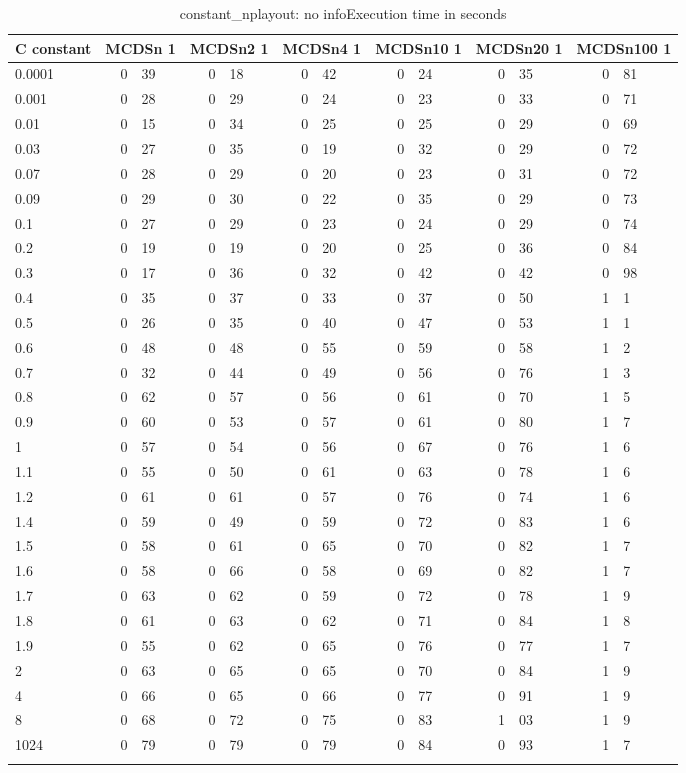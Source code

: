 \begin{table}
    \caption{constant_nplayout: no infoExecution time in seconds}
    \begin{tabular}{l*6{r@{.}l}} 
        \toprule
        C constant & \multicolumn{2}{c}{MCDSn 1}&\multicolumn{2}{c}{MCDSn2 1}&\multicolumn{2}{c}{MCDSn4 1}&\multicolumn{2}{c}{MCDSn10 1}&\multicolumn{2}{c}{MCDSn20 1}&\multicolumn{2}{c}{MCDSn100 1}\\
        \midrule
        0.0001 & 0&39 & 0&18 & 0&42 & 0&24 & 0&35 & 0&81\\
        0.001 & 0&28 & 0&29 & 0&24 & 0&23 & 0&33 & 0&71\\
        0.01 & 0&15 & 0&34 & 0&25 & 0&25 & 0&29 & 0&69\\
        0.03 & 0&27 & 0&35 & 0&19 & 0&32 & 0&29 & 0&72\\
        0.07 & 0&28 & 0&29 & 0&20 & 0&23 & 0&31 & 0&72\\
        0.09 & 0&29 & 0&30 & 0&22 & 0&35 & 0&29 & 0&73\\
        0.1 & 0&27 & 0&29 & 0&23 & 0&24 & 0&29 & 0&74\\
        0.2 & 0&19 & 0&19 & 0&20 & 0&25 & 0&36 & 0&84\\
        0.3 & 0&17 & 0&36 & 0&32 & 0&42 & 0&42 & 0&98\\
        0.4 & 0&35 & 0&37 & 0&33 & 0&37 & 0&50 & 1&1\\
        0.5 & 0&26 & 0&35 & 0&40 & 0&47 & 0&53 & 1&1\\
        0.6 & 0&48 & 0&48 & 0&55 & 0&59 & 0&58 & 1&2\\
        0.7 & 0&32 & 0&44 & 0&49 & 0&56 & 0&76 & 1&3\\
        0.8 & 0&62 & 0&57 & 0&56 & 0&61 & 0&70 & 1&5\\
        0.9 & 0&60 & 0&53 & 0&57 & 0&61 & 0&80 & 1&7\\
        1 & 0&57 & 0&54 & 0&56 & 0&67 & 0&76 & 1&6\\
        1.1 & 0&55 & 0&50 & 0&61 & 0&63 & 0&78 & 1&6\\
        1.2 & 0&61 & 0&61 & 0&57 & 0&76 & 0&74 & 1&6\\
        1.4 & 0&59 & 0&49 & 0&59 & 0&72 & 0&83 & 1&6\\
        1.5 & 0&58 & 0&61 & 0&65 & 0&70 & 0&82 & 1&7\\
        1.6 & 0&58 & 0&66 & 0&58 & 0&69 & 0&82 & 1&7\\
        1.7 & 0&63 & 0&62 & 0&59 & 0&72 & 0&78 & 1&9\\
        1.8 & 0&61 & 0&63 & 0&62 & 0&71 & 0&84 & 1&8\\
        1.9 & 0&55 & 0&62 & 0&65 & 0&76 & 0&77 & 1&7\\
        2 & 0&63 & 0&65 & 0&65 & 0&70 & 0&84 & 1&9\\
        4 & 0&66 & 0&65 & 0&66 & 0&77 & 0&91 & 1&9\\
        8 & 0&68 & 0&72 & 0&75 & 0&83 & 1&03 & 1&9\\
        1024 & 0&79 & 0&79 & 0&79 & 0&84 & 0&93 & 1&7\\
        \bottomrule
    \label{constant_nplayout}
    \end{tabular}
\end{table}